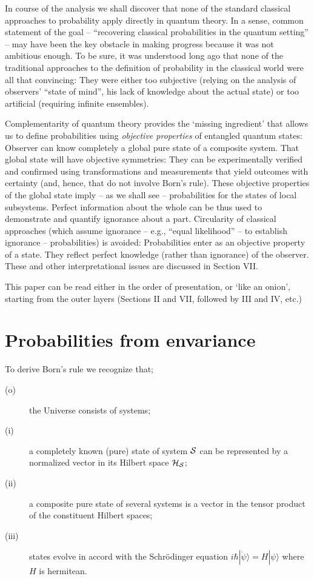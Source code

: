 \documentclass[aps,twocolumn,pra,epsfig]{revtex4}
\begin{document}
In course of the analysis we shall discover that none of the standard classical
approaches to probability apply directly in quantum theory. In a sense,  common
statement of the goal -- ``recovering classical probabilities in the quantum
setting'' -- may have been the key obstacle in making progress because it
was not ambitious enough. To be sure, it was understood long ago that none of
the traditional approaches to the definition of probability in the classical
world were all that convincing: They were either too subjective (relying
on the analysis of observers'  ``state of mind'', his lack of knowledge 
about the actual state) or too artificial (requiring infinite ensembles).

Complementarity of quantum theory provides the `missing ingredient' that
allows us to define probabilities using {\it objective properties} of entangled 
quantum states: Observer can know completely a global pure state of 
a composite system. That global state will have objective symmetries: They can be
experimentally verified and confirmed using transformations and measurements
that yield outcomes with certainty (and, hence, that do not involve Born's rule).
These objective properties of the global state imply -- as we shall see --
probabilities for the states of  local subsystems. Perfect information about the whole
can be thus used to demonstrate and quantify ignorance about a part. Circularity
of classical approaches (which assume ignorance -- e.g., ``equal likelihood'' -- to
establish ignorance -- probabilities) is avoided: Probabilities enter as an objective
property of a state. They reflect perfect knowledge (rather than ignorance) of 
the observer. These and other interpretational issues are discussed
in Section VII.

This paper can be read either in the order of presentation, or `like an onion',
starting from the outer layers (Sections II and VII, followed by III and IV, etc.)

\section{Probabilities from envariance}

To derive Born's rule we recognize that;
\begin{description}
\item[(o)] the Universe consists of systems;
\item[(i)] a completely known (pure) state of system ${\cal S}$ can
be represented by  a normalized vector in its Hilbert space ${\cal H_S}$;
\item[(ii)] a composite pure state of several systems is a vector
in the tensor product of the constituent Hilbert spaces;
\item[(iii)] states evolve in accord with the Schr\"odinger
equation $i \hbar |\dot \psi \rangle = H |\psi\rangle$ where $H$ is hermitean.
\end{description}
\end{document}

